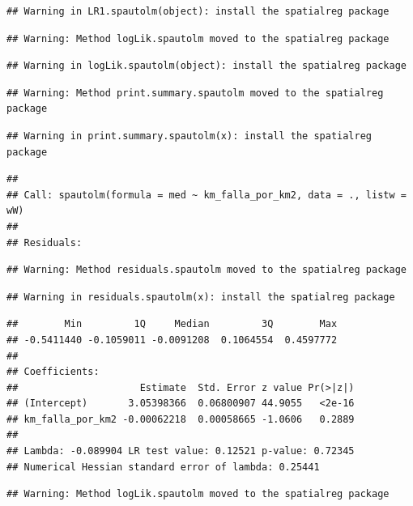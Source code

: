\documentclass[11pt,]{article}
\begin{document}
\begin{verbatim}
## Warning in LR1.spautolm(object): install the spatialreg package
\end{verbatim}

\begin{verbatim}
## Warning: Method logLik.spautolm moved to the spatialreg package
\end{verbatim}

\begin{verbatim}
## Warning in logLik.spautolm(object): install the spatialreg package
\end{verbatim}

\begin{verbatim}
## Warning: Method print.summary.spautolm moved to the spatialreg package
\end{verbatim}

\begin{verbatim}
## Warning in print.summary.spautolm(x): install the spatialreg package
\end{verbatim}

\begin{verbatim}
## 
## Call: spautolm(formula = med ~ km_falla_por_km2, data = ., listw = wW)
## 
## Residuals:
\end{verbatim}

\begin{verbatim}
## Warning: Method residuals.spautolm moved to the spatialreg package
\end{verbatim}

\begin{verbatim}
## Warning in residuals.spautolm(x): install the spatialreg package
\end{verbatim}

\begin{verbatim}
##        Min         1Q     Median         3Q        Max 
## -0.5411440 -0.1059011 -0.0091208  0.1064554  0.4597772 
## 
## Coefficients: 
##                     Estimate  Std. Error z value Pr(>|z|)
## (Intercept)       3.05398366  0.06800907 44.9055   <2e-16
## km_falla_por_km2 -0.00062218  0.00058665 -1.0606   0.2889
## 
## Lambda: -0.089904 LR test value: 0.12521 p-value: 0.72345 
## Numerical Hessian standard error of lambda: 0.25441
\end{verbatim}

\begin{verbatim}
## Warning: Method logLik.spautolm moved to the spatialreg package
\end{verbatim}
\end{document}
